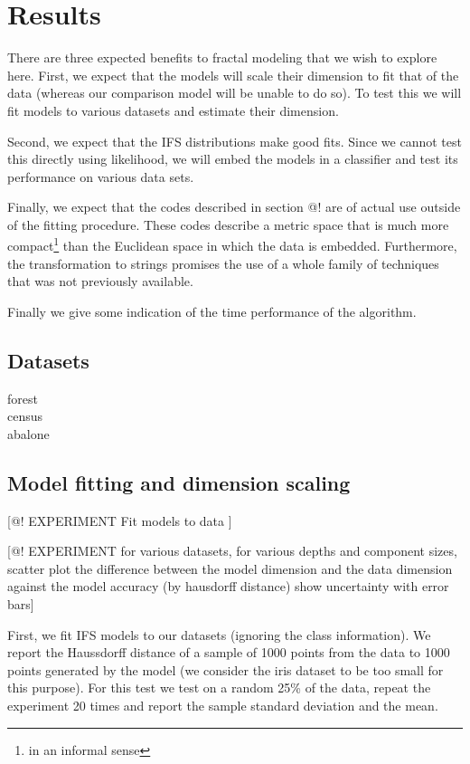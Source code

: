 \documentclass[11pt]{article}
\theoremstyle{definition}
\begin{document}
\section{Results}

There are three expected benefits to fractal modeling that we wish to explore here. First, we expect that the models will scale their dimension to fit that of the data (whereas our comparison model will be unable to do so). To test this we will fit models to various datasets and estimate their dimension. 

Second, we expect that the IFS distributions make good fits. Since we cannot test this directly using likelihood, we will embed the models in a classifier and test its performance on various data sets.

Finally, we expect that the codes described in section @! are of actual use outside of the fitting procedure. These codes describe a metric space that is much more compact\footnote{in an informal sense} than the Euclidean space in which the data is embedded. Furthermore, the transformation to strings promises the use of a whole family of techniques that was not previously available.

Finally we give some indication of the time performance of the algorithm.

\subsection{Datasets}

\begin{description}
  \item[forest]
  \item[census]
  \item[abalone]
\end{description}

\subsection{Model fitting and dimension scaling}

[@! EXPERIMENT Fit models to data ]

[@! EXPERIMENT for various datasets, for various depths and component sizes, scatter plot the difference between the model dimension and the data dimension against the model accuracy (by hausdorff distance) show uncertainty with error bars]

First, we fit IFS models to our datasets (ignoring the class information). We report the Haussdorff distance of a sample of 1000 points from the data to 1000 points generated by the model (we consider the iris dataset to be too small for this purpose). For this test we test on a random 25\% of the data, repeat the experiment 20 times and report the sample standard deviation and the mean.
\end{document}

